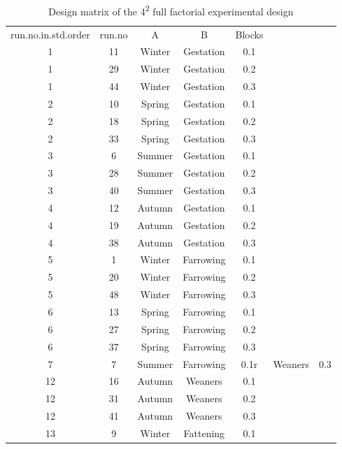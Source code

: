 \begin{table}[]
\centering
\caption{Design matrix of the 4\textsuperscript{2} full factorial experimental design}
\label{table5}
\begin{tabular}{ccccc}
run.no.in.std.order & run.no & A      & B         & Blocks \\
1                   & 11     & Winter & Gestation & 0.1    \\
1                   & 29     & Winter & Gestation & 0.2    \\
1                   & 44     & Winter & Gestation & 0.3    \\
2                   & 10     & Spring & Gestation & 0.1    \\
2                   & 18     & Spring & Gestation & 0.2    \\
2                   & 33     & Spring & Gestation & 0.3    \\
3                   & 6      & Summer & Gestation & 0.1    \\
3                   & 28     & Summer & Gestation & 0.2    \\
3                   & 40     & Summer & Gestation & 0.3    \\
4                   & 12     & Autumn & Gestation & 0.1    \\
4                   & 19     & Autumn & Gestation & 0.2    \\
4                   & 38     & Autumn & Gestation & 0.3    \\
5                   & 1      & Winter & Farrowing & 0.1    \\
5                   & 20     & Winter & Farrowing & 0.2    \\
5                   & 48     & Winter & Farrowing & 0.3    \\
6                   & 13     & Spring & Farrowing & 0.1    \\
6                   & 27     & Spring & Farrowing & 0.2    \\
6                   & 37     & Spring & Farrowing & 0.3    \\
7                   & 7      & Summer & Farrowing & 0.1r & Weaners   & 0.3    \\
12                  & 16     & Autumn & Weaners   & 0.1    \\
12                  & 31     & Autumn & Weaners   & 0.2    \\
12                  & 41     & Autumn & Weaners   & 0.3    \\
13                  & 9      & Winter & Fattening & 0.1    \\

\end{tabular}
\end{table}
